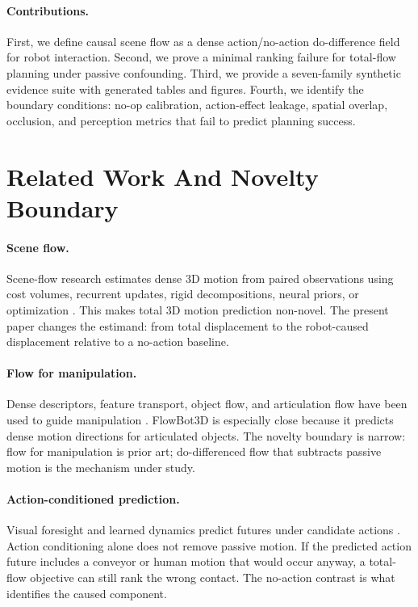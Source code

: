 \documentclass{article}
\begin{document}
\paragraph{Contributions.}
First, we define causal scene flow as a dense action/no-action do-difference field for
robot interaction.  Second, we prove a minimal ranking failure for total-flow planning
under passive confounding.  Third, we provide a seven-family synthetic evidence suite
with generated tables and figures.  Fourth, we identify the boundary conditions: no-op
calibration, action-effect leakage, spatial overlap, occlusion, and perception metrics
that fail to predict planning success.

\section{Related Work And Novelty Boundary}

\paragraph{Scene flow.}
Scene-flow research estimates dense 3D motion from paired observations using cost
volumes, recurrent updates, rigid decompositions, neural priors, or optimization
\citep{sceneflowfields,flownet3d,pointpwc,raft3d,nsfp,flowstep3d}.  This makes total
3D motion prediction non-novel.  The present paper changes the estimand: from total
displacement to the robot-caused displacement relative to a no-action baseline.

\paragraph{Flow for manipulation.}
Dense descriptors, feature transport, object flow, and articulation flow have been used
to guide manipulation \citep{denseobjectnets,transporter,flowbot3d,flowbotpp}.  FlowBot3D
is especially close because it predicts dense motion directions for articulated objects.
The novelty boundary is narrow: flow for manipulation is prior art; do-differenced flow
that subtracts passive motion is the mechanism under study.

\paragraph{Action-conditioned prediction.}
Visual foresight and learned dynamics predict futures under candidate actions
\citep{visualforesight,interactionnetworks,pushinggrasping}.  Action conditioning alone
does not remove passive motion.  If the predicted action future includes a conveyor or
human motion that would occur anyway, a total-flow objective can still rank the wrong
contact.  The no-action contrast is what identifies the caused component.
\end{document}
